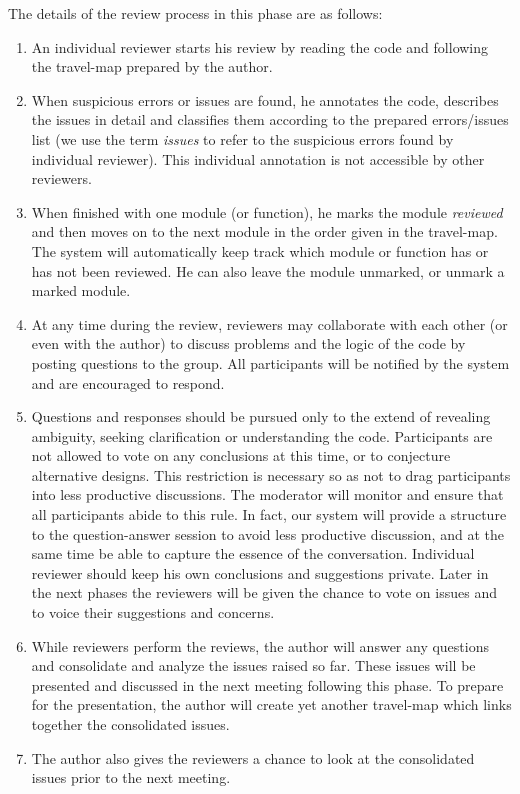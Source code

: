 \noindent The details of the review process in this phase are as follows:
\begin {enumerate}
\item An individual reviewer starts his review by reading the code
and following the travel-map prepared by the author.
\item When suspicious errors or issues are found, he annotates
the code, describes the issues in detail and
classifies  them according to the prepared errors/issues list 
(we use the term {\it issues} to refer to the suspicious errors found by
individual reviewer).
This individual annotation is not accessible by other reviewers.

\item When finished with one module (or function), he marks the module 
{\it reviewed} and then moves on to the next module  in the
order given in the travel-map.
The system will automatically keep track which module or
function has or has not been reviewed.  He can also leave the module
unmarked, or unmark a marked module. 

\item At any time during the review, reviewers may collaborate with 
each other
(or even with the author) to discuss  problems and  the logic of
the code  by posting questions to the group.  All participants will be
notified by the system  and are encouraged to respond.

\item Questions and responses should be pursued only to the
extend of revealing ambiguity, seeking clarification or understanding
the code.  Participants are not allowed to vote on 
any conclusions at this time, or to conjecture alternative designs.  
This restriction 
is necessary so as not to drag participants into less productive 
discussions. The moderator will monitor and ensure that all participants
abide to this rule. In fact, our system will provide a structure 
to the question-answer session to avoid less productive discussion,
and at the same time be able to capture the essence of the conversation.
Individual reviewer should keep
his own conclusions and suggestions private.  Later in the next
phases the reviewers will be given the chance to vote on issues and
to voice their suggestions and concerns.

\item While reviewers perform the reviews, the author will
answer any questions and 
consolidate and analyze the  issues raised so far.
These issues will be presented and discussed in the next meeting
following this phase.  To prepare for the presentation,
the author will create yet another travel-map which links together
the consolidated issues.
\item The author also gives the reviewers a chance to look
at the consolidated issues  prior to the next meeting. 
\end {enumerate}


